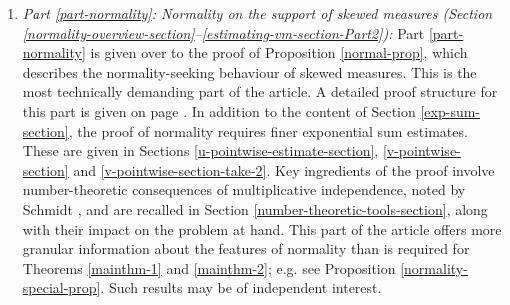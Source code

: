 \documentclass[12pt, twoside]{article}
\theoremstyle{definition}
\numberwithin{equation}{section}
\begin{document}
\begin{enumerate}[1.]
These estimates are not reliant on number-theoretic properties of $\mathscr{B}'$, and are also useful 
in later Sections \ref{u-pointwise-estimate-section}, \ref{v-pointwise-section} and \ref{v-pointwise-section-take-2} of Part \ref{part-normality}. This section highlights the role of the elementary operation in attaining the Rajchman property. As an application, we find a probability measure supported on absolutely non-normal numbers with quantifiable Fourier decay; see Section \ref{Appendix}.  
\item {\em{Part \ref{part-normality}: Normality on the support of skewed measures (Section \ref{normality-overview-section}--\ref{estimating-vm-section-Part2}):}} Part \ref{part-normality} is given over to the proof of Proposition \ref{normal-prop}, which describes the normality-seeking behaviour of skewed measures. This is the most technically demanding part of the article. A detailed proof structure for this part is given on page \pageref{normality-proof}. In addition to the content of Section \ref{exp-sum-section}, the proof of normality requires finer exponential sum estimates. These are given in Sections \ref{u-pointwise-estimate-section}, \ref{v-pointwise-section} and \ref{v-pointwise-section-take-2}. 
Key ingredients of the proof involve number-theoretic consequences of multiplicative independence, noted by Schmidt \cite{s60}, and are recalled in Section \ref{number-theoretic-tools-section}, along with their impact on the problem at hand. This part of the article offers more granular information about the features of normality than is required for Theorems \ref{mainthm-1} and \ref{mainthm-2}; e.g. see Proposition \ref{normality-special-prop}. Such results may be of independent interest.    
\end{enumerate} 
\end{document}
